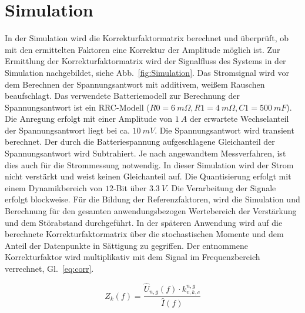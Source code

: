 \section{Simulation}

In der Simulation wird die Korrekturfaktormatrix berechnet und überprüft, ob mit den ermittelten Faktoren eine Korrektur der Amplitude möglich ist. Zur Ermittlung der Korrekturfaktormatrix wird der Signalfluss des Systems in der Simulation nachgebildet, siehe Abb.~\ref{fig:Simulation}. Das Stromsignal wird vor dem Berechnen der Spannungsantwort mit additivem, weißem Rauschen beaufschlagt. Das verwendete Batteriemodell zur Berechnung der Spannungsantwort ist ein RRC-Modell ($R0 = \SI{6}{m\Omega}, R1=\SI{4}{m\Omega}, C1=\SI{500}{mF}$). Die Anregung erfolgt mit einer Amplitude von $\SI{1}{A}$ der erwartete Wechselanteil der Spannungsantwort liegt bei ca. $\SI{10}{mV}$. Die Spannungsantwort wird transient berechnet. Der durch die Batteriespannung aufgeschlagene Gleichanteil der Spannungsantwort wird Subtrahiert. Je nach angewandtem Messverfahren, ist dies auch für die Strommessung notwendig. In dieser Simulation wird der Strom nicht verstärkt und weist keinen Gleichanteil auf. Die Quantisierung erfolgt mit einem Dynamikbereich von $12$-Bit über  $\SI{3.3}{V}$. Die Verarbeitung der Signale erfolgt blockweise. Für die Bildung der Referenzfaktoren, wird die Simulation und Berechnung für den gesamten anwendungsbezogen Wertebereich der Verstärkung und dem Störabstand durchgeführt. In der späteren Anwendung wird auf die berechnete Korrekturfaktormatrix über die stochastischen Momente und dem Anteil der Datenpunkte in Sättigung zu gegriffen. Der entnommene Korrekturfaktor wird multiplikativ mit dem Signal im Frequenzbereich verrechnet, Gl.~\eqref{eq:corr}. 

\begin{equation}
	\label{eq:corr}
	Z_k(f) = \frac{\hat{U}_{n,g}(f) \cdot k_{v,k,c}^{n,g}}{\hat{I}(f)}
\end{equation}

